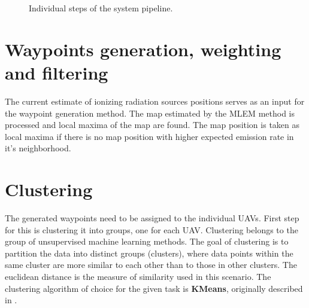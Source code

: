 \begin{figure}[!h]
{    \label{fig:pip5}
  }
  \caption{Individual steps of the system pipeline.}
  \label{fig:pipeline}
\end{figure}

\section{Waypoints generation, weighting and filtering}
The current estimate of ionizing radiation sources positions serves as an input for the waypoint generation method.
The map estimated by the \ac{MLEM} method is processed and local maxima of the map are found.
The map position is taken as local maxima if there is no map position with higher expected emission rate in it's neighborhood.

\section{Clustering}
The generated waypoints need to be assigned to the individual \ac{UAV}s. 
First step for this is clustering it into groups, one for each \ac{UAV}.
Clustering belongs to the group of unsupervised machine learning methods.
The goal of clustering is to partition the data into distinct groups (clusters), where data points within the same cluster are more similar to each other than to those in other clusters.
The euclidean distance is the measure of similarity used in this scenario.
The clustering algorithm of choice for the given task is \textbf{KMeans}, originally described in \cite{kmeans}.


